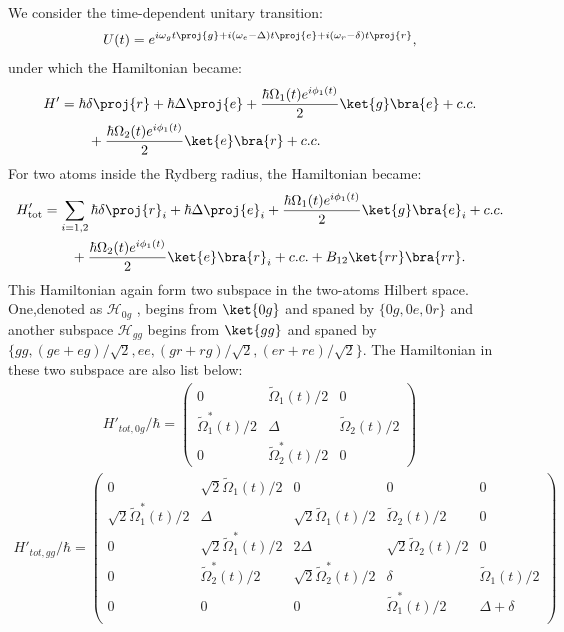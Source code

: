 \documentclass[11pt]{article}
\begin{document}
We consider the time-dependent unitary transition:
\begin{align}
    U(t) = e^{i\omega_g t \proj{g} + i(\omega_e - \Delta)t \proj{e} + i(\omega_r - \delta)t \proj{r}},
\end{align}
under which the Hamiltonian became:
\begin{align}
\label{eq:Lamman-two-photon}
    H' &= \hbar \delta \proj{r} + \hbar \Delta \proj{e} + \frac{\hbar \Omega_1(t) e^{i \phi_1(t)}}{2} \ket{g}\bra{e} + c.c.  \notag \\
    & \quad \quad +\frac{\hbar \Omega_2(t) e^{i \phi_1(t)}}{2} \ket{e}\bra{r} + c.c.
\end{align}
For two atoms inside the Rydberg radius, the Hamiltonian became:
\begin{align}
    H'_{\rm tot} &=\sum_{i = 1,2} \hbar \delta \proj{r}_i + \hbar \Delta \proj{e}_i + \frac{\hbar \Omega_1(t) e^{i \phi_1(t)}}{2} \ket{g}\bra{e}_i + c.c.  \notag \\
    &\quad \quad +\frac{\hbar \Omega_2(t) e^{i \phi_1(t)}}{2} \ket{e}\bra{r}_i + c.c. + B_{12} \ket{rr}\bra{rr}.
\end{align}
This Hamiltonian again form two subspace in the two-atoms Hilbert space. One,denoted as $\mathcal{H}_{0g}$ , begins from $\ket{0g}$ and spaned by $\{0g, 0e,0r\}$ and another subspace $\mathcal{H}_{gg}$ begins from $\ket{gg}$ and spaned by $\{gg,(ge+eg)/\sqrt{2},ee,(gr+rg)/\sqrt{2},(er+re)/\sqrt{2}\}$. The Hamiltonian in these two subspace are also list below:
\begin{align}
    H'_{tot,0g}/\hbar = 
    \begin{pmatrix}
        0 & \tilde\Omega_1(t)/2 & 0 \\
        \tilde\Omega_1^*(t)/2 &  \Delta & \tilde\Omega_2(t)/2\\
        0 & \tilde\Omega_2^*(t)/2 &   0
    \end{pmatrix}
\end{align}
\begin{align}
    H'_{tot,gg}/\hbar = 
    \begin{pmatrix}
        0 & \sqrt{2}\tilde\Omega_1(t)/2 & 0&0&0 \\
        \sqrt{2}\tilde\Omega_1^*(t)/2 &  \Delta &  \sqrt{2}\tilde\Omega_1(t)/2&\tilde\Omega_2(t)/2&0\\
        0 &  \sqrt{2}\tilde\Omega_1^*(t)/2 &   2\Delta&\sqrt{2}\tilde\Omega_2(t)/2&0 \\
        0&\tilde\Omega_2^*(t)/2&\sqrt{2}\tilde\Omega_2^*(t)/2&\delta&\tilde\Omega_1(t)/2 \\
        0&0&0&\tilde\Omega^*_1(t)/2&\Delta + \delta \\
    \end{pmatrix}
\end{align}
\end{document}
